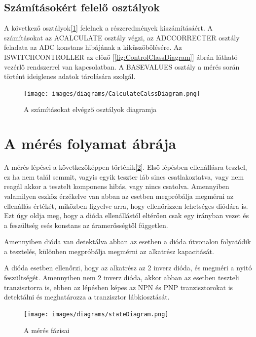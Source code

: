 \subsection{Számításokért felelő osztályok}

A következő osztályok[\ref{fig:CalculateClassDiagram}] felelnek a részeredmények kiszámításáért. A 
számításokat az ACALCULATE osztály végzi, az ADCCORRECTER osztály
feladata az ADC konstans hibájának a kiküszöbölésére. Az 
ISWITCHCONTROLLER az előző [\ref{fig:ControlClassDiagram}] ábrán látható
vezérlő rendszerrel van kapcsolatban. A BASEVALUES osztály a mérés során
történt ideiglenes adatok tárolására szolgál.


\begin{figure}[H]
    \centering
    \texttt{[image: images/diagrams/CalculateCalssDiagram.png]}
    \caption{A számításokat elvégző osztályok diagramja}
    \label{fig:CalculateClassDiagram}
\end{figure}

\section{A mérés folyamat ábrája}

A mérés lépései a következőképpen történik[\ref{fig:CalculateStateDiagram}].
Első lépésben ellenállásra tesztel, ez ha nem talál semmit,
vagyis egyik teszter láb sincs csatlakoztatva, vagy nem reagál akkor 
a tesztelt komponens hibás, vagy nincs csatolva. Amennyiben valamilyen 
eszköz érzékelve van abban az esetben megpróbálja megmérni az ellenállás 
értékét, miközben figyelve arra, hogy ellenőrizzen lehetséges diódára is.
Ezt úgy oldja meg, hogy a dióda ellenállástól eltérően csak egy irányban vezet és
a feszültség esés konstans az áramerősségtől független.

Amennyiben dióda van detektálva abban az esetben a dióda útvonalon folyatódik a
tesztelés, különben megpróbálja megmérni az alkatrész kapacitását.

A dióda esetben ellenőrzi, hogy az alkatrész az 2 inverz dióda, és 
megméri a nyitó feszültségét. Amennyiben nem 2 inverz dióda, akkor abban az esetben
teszteli tranzisztorra is, ebben az lépésben képes az NPN és PNP tranzisztorokat
is detektálni és meghatározza a tranzisztor lábkiosztását.

\begin{figure}[H]
    \centering
    \texttt{[image: images/diagrams/stateDiagram.png]}
    \caption{A mérés fázisai}
    \label{fig:CalculateStateDiagram}
\end{figure}

